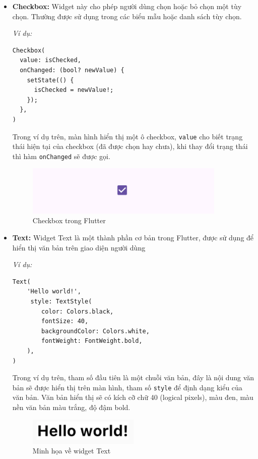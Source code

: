 \documentclass[../DoAn.tex]{subfiles}
\numberwithin{figure}{chapter}
\begin{document}
\begin{itemize}
\item \textbf{Checkbox:} Widget này cho phép người dùng chọn hoặc bỏ chọn một tùy chọn. Thường được sử dụng trong các biểu mẫu hoặc danh sách tùy chọn.

\textit{Ví dụ:}
\begin{lstlisting}
Checkbox(
  value: isChecked,
  onChanged: (bool? newValue) {
    setState(() {
      isChecked = newValue!;
    });
  },
)
\end{lstlisting}


Trong ví dụ trên, màn hình hiển thị một ô checkbox, \texttt{value} cho biết trạng thái hiện tại của checkbox (đã được chọn hay chưa), khi thay đổi trạng thái thì hàm \texttt{onChanged} sẽ được gọi.

\begin{figure}[H]
    \centering
    \includegraphics[width=0.9\textwidth]{Hinhve/Chuong5/checkboxWidget.png}
    \caption{Checkbox trong Flutter}
    \label{fig:checkboxwidget}
\end{figure}

\item \textbf{Text: }
Widget Text là một thành phần cơ bản trong Flutter, được sử dụng để hiển thị văn bản trên giao diện người dùng

\textit{Ví dụ:}

\begin{lstlisting}
Text(
    'Hello world!',
     style: TextStyle(
        color: Colors.black,
        fontSize: 40,
        backgroundColor: Colors.white,
        fontWeight: FontWeight.bold,
    ),
)
\end{lstlisting}

Trong ví dụ trên, tham số đầu tiên là một chuỗi văn bản, đây là nội dung văn bản sẽ được hiển thị trên màn hình, tham số \texttt{style} để định dạng kiểu của văn bản. Văn bản hiển thị sẽ có kích cỡ chữ 40 (logical pixels), màu đen, màu nền văn bản màu trắng, độ đậm bold.
\begin{figure}[H]
    \centering
    \includegraphics[width=0.5\textwidth]{Hinhve/Chuong5/vd1_text.png}
    \caption{Minh họa về widget Text}
    \label{fig:vd1_text}
\end{figure}


\end{itemize}
\end{document}
